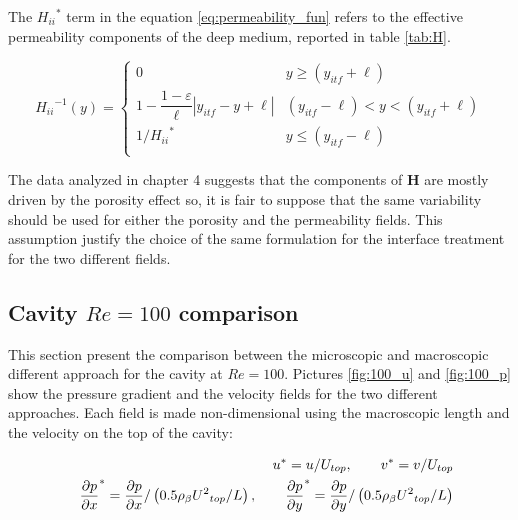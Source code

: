 The ${H_{ii}}^{*}$ term in the equation \eqref{eq:permeability_fun} refers to the effective permeability components of the deep medium, reported in table \ref{tab:H}.

\begin{equation}
{H_{ii}}^{-1}(y) = 
\begin{cases}
0 & y\geqslant(y_{itf}+\ell) \\
1 - \dfrac{1-\varepsilon}{\ell}|y_{itf} -y +\ell| &  (y_{itf}-\ell)<y<(y_{itf}+\ell)\\
1/{H_{ii}}^{*} &y\leqslant(y_{itf}-\ell) \\
\end{cases}
\label{eq:permeability_fun}
\end{equation}

The data analyzed in chapter 4 suggests that the components of $\mathbf{H}$ are mostly driven by the porosity effect so, it is fair to suppose that the same variability should be used for either the porosity and the permeability fields. This assumption justify the choice of the same formulation for the interface treatment for the two different fields.

\subsection{Cavity $Re=100$ comparison}

This section present the comparison between the microscopic and macroscopic different approach for the cavity at $Re=100$. Pictures \ref{fig:100_u} and \ref{fig:100_p} show the pressure gradient and the velocity fields for the two different approaches.
Each field is made non-dimensional using the macroscopic length and the velocity on the top of the cavity:

\begin{eqnarray}
&& u^* = u/U_{top}, \qquad v^* = v/U_{top} \nonumber \\
&& \dfrac{\partial p}{\partial x}^* = \dfrac{\partial p}{\partial x} / \left(0.5 \rho_{\beta} {U^2}_{top} /L  \right), \qquad \dfrac{\partial p}{\partial y}^* = \dfrac{\partial p}{\partial y} / \left(0.5 \rho_{\beta} {U^2}_{top} /L  \right) \nonumber
\end{eqnarray}


